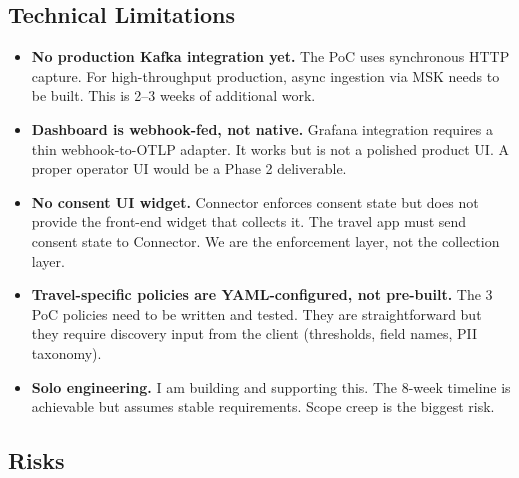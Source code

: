 \documentclass[11pt, a4paper]{article}
\begin{document}
\subsection{Technical Limitations}

\begin{itemize}
  \item \textbf{No production Kafka integration yet.} The PoC uses synchronous HTTP capture. For high-throughput production, async ingestion via MSK needs to be built. This is 2--3 weeks of additional work.

  \item \textbf{Dashboard is webhook-fed, not native.} Grafana integration requires a thin webhook-to-OTLP adapter. It works but is not a polished product UI. A proper operator UI would be a Phase 2 deliverable.

  \item \textbf{No consent UI widget.} Connector enforces consent state but does not provide the front-end widget that collects it. The travel app must send consent state to Connector. We are the enforcement layer, not the collection layer.

  \item \textbf{Travel-specific policies are YAML-configured, not pre-built.} The 3 PoC policies need to be written and tested. They are straightforward but they require discovery input from the client (thresholds, field names, PII taxonomy).

  \item \textbf{Solo engineering.} I am building and supporting this. The 8-week timeline is achievable but assumes stable requirements. Scope creep is the biggest risk.
\end{itemize}

\subsection{Risks}
\end{document}
